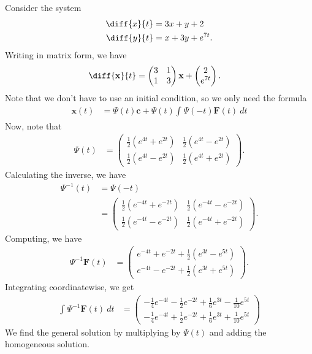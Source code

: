 \documentclass[10pt]{mypackage}
\begin{document}
\begin{example}
  Consider the system
  \begin{align*}
    \diff{x}{t} &= 3x + y + 2\\
    \diff{y}{t} &= x + 3y + e^{7t}.
  \end{align*}
  Writing in matrix form, we have
  \begin{align*}
    \diff{\mathbf{x}}{t} &= \begin{pmatrix}3 &1 \\ 1 & 3\end{pmatrix}\mathbf{x} + \begin{pmatrix}2\\e^{7t}\end{pmatrix}.
  \end{align*}
  Note that we don't have to use an initial condition, so we only need the formula
  \begin{align*}
    \mathbf{x}(t) &= \Psi(t)\mathbf{c} + \Psi(t) \int_{}^{} \Psi(-t)\mathbf{F}(t)\:dt
  \end{align*}
  Now, note that
  \begin{align*}
    \Psi(t) &= \begin{pmatrix}\frac{1}{2}\left( e^{4t} + e^{2t} \right) & \frac{1}{2}\left( e^{4t} - e^{2t} \right) \\ \frac{1}{2}\left( e^{4t} - e^{2t} \right) & \frac{1}{2}\left( e^{4t} + e^{2t} \right)\end{pmatrix}.
  \end{align*}
  Calculating the inverse, we have
  \begin{align*}
    \Psi^{-1}(t) &= \Psi\left( -t \right)\\
                 &= \begin{pmatrix}\frac{1}{2}\left( e^{-4t} + e^{-2t} \right) & \frac{1}{2}\left( e^{-4t} - e^{-2t} \right) \\ \frac{1}{2}\left( e^{-4t} - e^{-2t} \right) & \frac{1}{2}\left( e^{-4t} + e^{-2t} \right)\end{pmatrix}.
  \end{align*}
  Computing, we have
  \begin{align*}
    \Psi^{-1}\mathbf{F}(t) &= \begin{pmatrix}e^{-4t} + e^{-2t} + \frac{1}{2}\left( e^{3t} - e^{5t} \right) \\ e^{-4t} - e^{-2t} + \frac{1}{2}\left( e^{3t} + e^{5t} \right)\end{pmatrix}.
  \end{align*}
  Integrating coordinatewise, we get
  \begin{align*}
    \int_{}^{} \Psi^{-1}\mathbf{F}(t)\:dt &= \begin{pmatrix}- \frac{1}{4}e^{-4t} - \frac{1}{2}e^{-2t} + \frac{1}{6}e^{3t} - \frac{1}{10}e^{5t} \\ -\frac{1}{4}e^{-4t} + \frac{1}{2}e^{-2t} + \frac{1}{6}e^{3t} + \frac{1}{10}e^{5t}\end{pmatrix}
  \end{align*}
  We find the general solution by multiplying by $\Psi(t)$ and adding the homogeneous solution.
\end{example}
\end{document}
